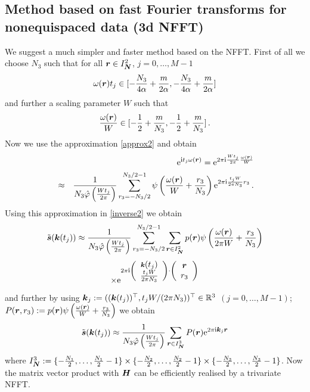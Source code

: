 \documentclass[journal]{IEEEtran}
\def\ti{\mbox{\scriptsize{\rm i}}}
\newcommand{\eip}[1]{{\rm e}^{ 2\pi{\ti} #1}}
\newcommand{\zb}[1]{\mbox{\boldmath{${#1}$}}}
\newcommand{\zbs}[1]{\mbox{\boldmath\scriptsize{${#1}$}}}
\newcommand{\zbss}[1]{\mbox{\boldmath\tiny{${#1}$}}}
\numberwithin{equation}{section}
\numberwithin{table}{section}
\numberwithin{figure}{section}
\begin{document}
\subsection{Method based on fast Fourier transforms for
   nonequispaced data (3d NFFT)}

We suggest a much simpler and faster method based on the NFFT.
First of all we choose $N_3$ such that 
for all $\zb r\in I_{\zbs N}^2$, $j=0,\ldots,M-1$
\begin{equation}\label{wahlN3}
\omega(\zb r)t_j
\in[-\frac{N_3}{4\alpha}+\frac{m}{2\alpha},-\frac{N_3}{4\alpha}+\frac{m}{2\alpha}] 
\end{equation}
and further a scaling parameter $W$ such that
\[
\frac{\omega(\zb r)}{W}
\in[-\frac{1}{2}+\frac{m}{N_3},-\frac{1}{2}+\frac{m}{N_3}]\, . 
\]
Now we use the approximation \eqref{approx2} and obtain
\begin{eqnarray} \label{appr_inh}
&&{\rm e}^{\ti t_j \omega(\zbs r)}  =
\eip{\frac{W t_j}{2\pi} \frac{\omega(\zbss r)}{W}}\\ \nonumber
&\approx&
\frac{1}{N_3\hat\varphi\left(\frac{Wt_j}{2\pi}\right)}
\sum_{r_3=-N_3/2}^{N_3/2-1} \psi \left(\frac{\omega(\zb
  r)}{W}+\frac{r_3}{N_3}\right)  \eip{\frac{t_jW}{2\pi N_3}r_3}\, .
\end{eqnarray}
Using this approximation in \eqref{inverse2} we obtain
\begin{equation*}
\tilde{\zb s}(\zb k(t_j))\approx
\frac{1}{N_3 \hat\varphi\left(\frac{Wt_j}{2\pi}\right)}
\sum_{r_3=-N_3/2}^{N_3/2-1}
\sum_{\zbs r \in I^2_{\zbss N}} 
p(\zb r) \psi \left(\frac{\omega(\zb r)}{2\pi W}+\frac{r_3}{N_3}\right)
\end{equation*}
\begin{equation*}
\times \eip{\left(\begin{array}{c}
\zbs k(t_j)\\
\frac{t_jW}{2\pi N_3}
\end{array}\right)
\cdot
\left(\begin{array}{c}
\zb r\\
r_3
\end{array}\right)
}
\end{equation*}
and further by using $\zb k_j:= ((\zb k(t_j))^{\top},
  t_jW/(2\pi N_3))^{\top}\in \mathbb{R}^3$ $(j=0,\ldots, M-1)$;
$P(\zb r,r_3):= p(\zb r) \psi \left(\frac{\omega(\zbs
  r)}{W}+\frac{r_3}{N_3}\right)$ 
we obtain
\begin{equation*}
\tilde{\zb s}(\zb k(t_j))\approx
\frac{1}{N_3 \hat\varphi\left(\frac{Wt_j}{2\pi}\right)}
\sum_{\zbs r \in I^3_{\zbss N}} 
P(\zb r) \eip{\zbs k_j\zbs r}
\end{equation*}
where $I^3_{\zbs N} :=
\{-\frac{N_1}{2},\dots,\frac{N_1}{2}-1\}\times\{-\frac{N_2}{2},\dots,
\frac{N_2}{2}-1\}\times\{-\frac{N_3}{2},\dots,\frac{N_3}{2}-1\}$.
Now the matrix vector product with $\zb H$ can be efficiently realised
by a trivariate NFFT.
\end{document}
